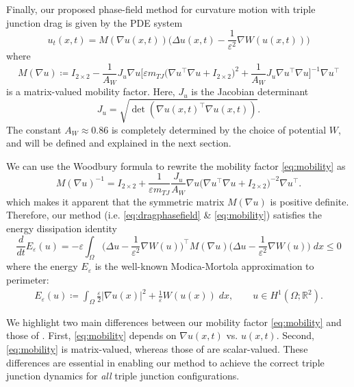 \documentclass{article}
\theoremstyle{plain}
\theoremstyle{definition}
\theoremstyle{remark}
\newcommand{\R}{\mathbb{R}}
\newcommand{\eps}{\varepsilon}
\begin{document}
Finally, our proposed phase-field method for curvature motion with triple junction drag is given by the PDE system
\begin{equation}\label{eq:dragphasefield}
    u_t(x,t) = M(\nabla u(x,t))\bigg( \Delta u (x,t) - \frac{1}{\eps^2}\nabla W(u(x,t)) \bigg)
\end{equation}
where
\begin{equation}\label{eq:mobility}
    M(\nabla u) \coloneqq I_{2\times 2} - \frac{1}{A_W}J_u\nabla u \bigg[\eps m_{TJ}\bigg(\nabla u^\top \nabla u + I_{2\times 2} \bigg)^2 + \frac{1}{A_W}J_u \nabla u^\top \nabla u \bigg]^{-1}\nabla u^\top 
\end{equation}
is a matrix-valued mobility factor. Here, $J_u$ is the Jacobian determinant
\begin{equation}
\label{eq:jacobian}
    J_u = \sqrt{\det(\nabla u(x,t)^\top \nabla u(x,t))}.
\end{equation}
The constant $A_W \approx 0.86$ is completely determined by the choice of potential $W$, and will be defined and explained in the next section.

We can use the Woodbury formula to rewrite the mobility factor \eqref{eq:mobility} as
\begin{equation}\label{eq:woodbury}
    M(\nabla u)^{-1} = I_{2\times 2} + \frac{1}{\eps m_{TJ}}\frac{J_u}{A_W}\nabla u \bigg( \nabla u^\top \nabla u + I_{2\times 2} \bigg)^{-2}\nabla u^\top.
\end{equation}
which makes it apparent that the symmetric matrix $M(\nabla u)$ is positive definite.
Therefore, our method (i.e. \eqref{eq:dragphasefield} \& \eqref{eq:mobility}) satisfies the energy dissipation identity
\begin{equation}\label{eq:energydissipation}
    \frac{d}{dt} E_\eps (u) = -\eps \int_\Omega \bigg(\Delta u - \frac{1}{\eps^2}\nabla W(u)\bigg)^\top M(\nabla u) \bigg(\Delta u - \frac{1}{\eps^2}\nabla W(u)\bigg)\;dx \leq 0
\end{equation}
where the energy $E_\varepsilon$ is the well-known Modica-Mortola \cite{modica_mortola} approximation to perimeter:
\begin{align}
\label{eq:mm}
    E_\eps(u)\coloneqq \int_{\Omega}\frac{\eps}{2}|\nabla u(x)|^2 + \frac{1}{\eps}W(u(x))\;dx, \qquad u\in H^1(\Omega;\R^2).
\end{align}

We highlight two main differences between our mobility factor \eqref{eq:mobility} and those of \cite{johnsonvoorhees,miyoshi2025}.
First, \eqref{eq:mobility} depends on $\nabla u(x,t)$ vs. $u(x,t)$.
Second, \eqref{eq:mobility} is matrix-valued, whereas those of \cite{johnsonvoorhees,miyoshi2025} are scalar-valued.
These differences are essential in enabling our method to achieve the correct triple junction dynamics for \emph{all} triple junction configurations.
\end{document}
